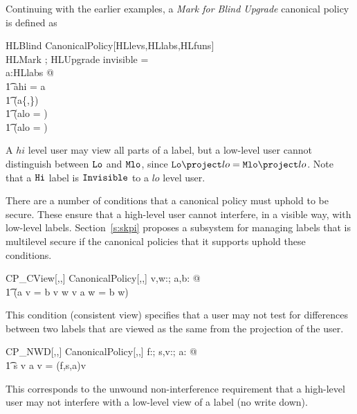 \begin{ex}
Continuing with the earlier examples, a {\it Mark for Blind Upgrade\/}
canonical policy is defined as
\begin{schema}{HLBlind}
CanonicalPolicy[HLlevs,HLlabs,HLfuns]\\
HLMark ; HLUpgrade
\where
invisible = \invis \\
\forall a:HLlabs @ \\
\t1 a\lproj hi = a \land \\
\t1 \IF (a\in\{\lo,\mlo\}) \\
\t1 \THEN (a\lproj lo = \lo) \\
\t1 \ELSE (a\lproj lo = \invis) 
\end{schema}
A $hi$ level user may view all parts of a label, but a low-level user cannot 
distinguish between $\mbox{\tt Lo}$ and $\mbox{\tt Mlo}$, since $\lo\lproj lo = \mlo\lproj lo$.
Note that a $\mbox{\tt Hi}$ label is $\mbox{\tt Invisible}$ to a $lo$ level user. 
\end{ex}

There are a number of conditions that a canonical policy must uphold to
be secure. These ensure that a high-level user cannot interfere, in a visible
way, with low-level labels. Section~\ref{s:skpi} proposes a
subsystem for managing labels that is multilevel 
secure if the canonical policies that it 
supports uphold these conditions.

\begin{schema}{CP\_CView[\LEVEL,\LABEL,\FID]}
CanonicalPolicy[\LEVEL,\LABEL,\FID]
\where
\forall v,w:\LEVEL; a,b: \LABEL @\\
\t1 (a \lproj v = b \lproj v \land w \fleq v \implies a \lproj w = b \lproj w)
\end{schema}
This condition (consistent view) specifies that a user may 
not  test for differences
between two labels that are viewed as the same
from the projection of the user. 

\begin{schema}{CP\_NWD[\LEVEL,\LABEL,\FID]}
CanonicalPolicy[\LEVEL,\LABEL,\FID]
\where
\forall f:\FID ; s,v:\LEVEL; a: \LABEL @\\
\t1 \lnot s \fleq v \implies a \lproj v = \Rfun(f,s,a)\lproj v 
\end{schema}
This corresponds to the unwound non-interference requirement that 
a high-level user may not interfere with a low-level view of a label 
(no write down). 

